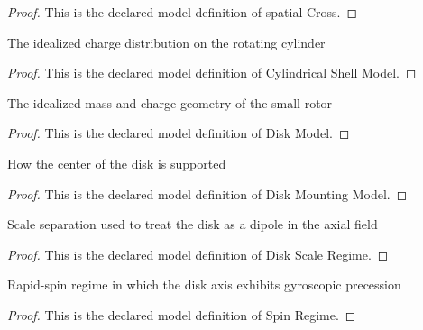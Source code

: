 \begin{proof}
  This is the declared model definition of spatial Cross.
\end{proof}
\begin{definition}
  \label{def:physics:phyx-mini-0967:phyxminiproblems-problemphyxmini0967-cylindricalshellmodel}
  The idealized charge distribution on the rotating cylinder
\end{definition}
\begin{proof}
  This is the declared model definition of Cylindrical Shell Model.
\end{proof}
\begin{definition}
  \label{def:physics:phyx-mini-0967:phyxminiproblems-problemphyxmini0967-diskmodel}
  The idealized mass and charge geometry of the small rotor
\end{definition}
\begin{proof}
  This is the declared model definition of Disk Model.
\end{proof}
\begin{definition}
  \label{def:physics:phyx-mini-0967:phyxminiproblems-problemphyxmini0967-diskmountingmodel}
  How the center of the disk is supported
\end{definition}
\begin{proof}
  This is the declared model definition of Disk Mounting Model.
\end{proof}
\begin{definition}
  \label{def:physics:phyx-mini-0967:phyxminiproblems-problemphyxmini0967-diskscaleregime}
  Scale separation used to treat the disk as a dipole in the axial field
\end{definition}
\begin{proof}
  This is the declared model definition of Disk Scale Regime.
\end{proof}
\begin{definition}
  \label{def:physics:phyx-mini-0967:phyxminiproblems-problemphyxmini0967-spinregime}
  Rapid-spin regime in which the disk axis exhibits gyroscopic precession
\end{definition}
\begin{proof}
  This is the declared model definition of Spin Regime.
\end{proof}
